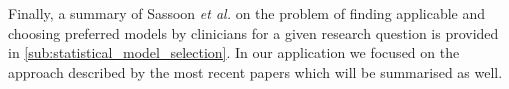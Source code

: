 Finally, a summary of Sassoon \textit{et al.} \cite{sassoon2014} on the problem of finding applicable and choosing preferred models by clinicians for a given research question is provided in \autoref{sub:statistical_model_selection}. In our application we focused on the approach described by the most recent papers \cite{sassoon2016,sassoon2016CD} which will be summarised as well.







% 
